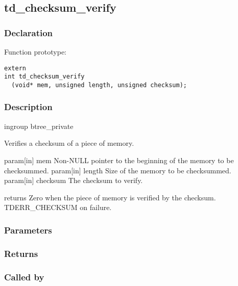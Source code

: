 
\newpage
\subsection{td\_checksum\_verify}
\subsubsection{Declaration} Function prototype:

\begin{verbatim}
extern
int td_checksum_verify
  (void* mem, unsigned length, unsigned checksum);
\end{verbatim}

\subsubsection{Description}

 
 ingroup btree\_private

 Verifies a checksum of a piece of memory.

 param[in] mem Non-NULL pointer to the beginning of the memory
 to be checksummed.
 param[in] length Size of the memory to be checksummed.
 param[in] checksum The checksum to verify.

 returns Zero when the piece of memory is verified by the checksum.
 TDERR\_CHECKSUM on failure.
 

\subsubsection{Parameters}
\subsubsection{Returns}
\subsubsection{Called by}
